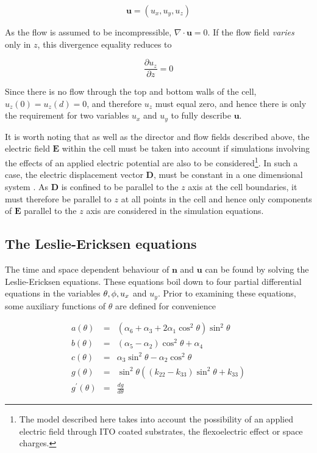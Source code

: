 \begin{equation}
\mathbf{u}=\left(u_x,u_y,u_z\right)
\end{equation}

\noindent As the flow is assumed to be incompressible, $\nabla\cdot\mathbf{u}=0$. If the flow field \textit{varies} only in $z$, this divergence equality reduces to 

\begin{equation}
\frac{\partial u_z}{\partial z}=0
\end{equation}

\noindent Since there is no flow through the top and bottom walls of the cell, $u_z\left(0\right)=u_z\left(d\right)=0$, and therefore $u_z$ must equal zero, and hence there is only the requirement for two variables $u_x$ and $u_y$ to fully describe $\mathbf{u}$.

It is worth noting that as well as the director and flow fields described above, the electric field $\mathbf{E}$ within the cell must be taken into account if simulations involving the effects of an applied electric potential are also to be considered\footnote{The model described here takes into account the possibility of an applied electric field through ITO coated substrates, the flexoelectric effect or space charges.}. In such a case, the electric displacement vector $\mathbf{D}$, must be constant in a one dimensional system \cite{Cornford2008}. As $\mathbf{D}$ is confined to be parallel to the $z$ axis at the cell boundaries, it must therefore be parallel to $z$ at all points in the cell and hence only components of $\mathbf{E}$ parallel to the $z$ axis are considered in the simulation equations.

\subsection{The Leslie-Ericksen equations}
The time and space dependent behaviour of $\mathbf{n}$ and $\mathbf{u}$ can be found by solving the Leslie-Ericksen equations. These equations boil down to four partial differential equations in the variables $\theta,\space\phi,\space u_x$ and $u_y$. Prior to examining these equations, some auxiliary functions of $\theta$ are defined for convenience \cite{Cornford2008}

\begin{eqnarray}
a\left(\theta\right)&=&\left(\alpha_6+\alpha_3+2\alpha_1\cos^2\theta\right)\sin^2\theta\\
b\left(\theta\right)&=&\left(\alpha_5-\alpha_2\right)\cos^2\theta+\alpha_4\\
c\left(\theta\right)&=&\alpha_3\sin^2\theta-\alpha_2\cos^2\theta\\
\label{eq:c}
g\left(\theta\right)&=&\sin^2\theta\left(\left(k_{22}-k_{33}\right)\sin^2\theta+k_{33}\right)\\
g^\prime\left(\theta\right)&=&\frac{dg}{d\theta}
\end{eqnarray}

